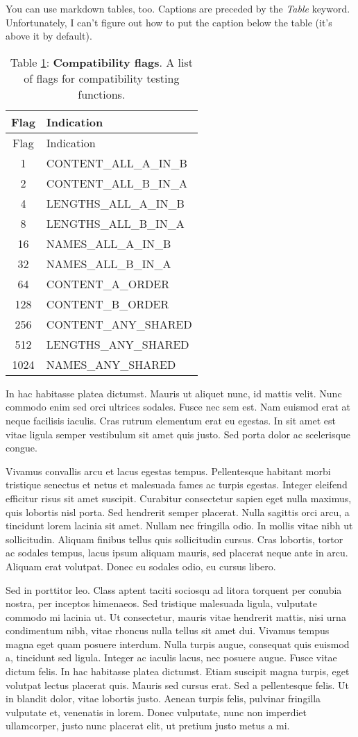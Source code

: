 \documentclass[10pt]{article}
\begin{document}
You can use markdown tables, too. Captions are preceded by the
\emph{Table} keyword. Unfortunately, I can't figure out how to put the
caption below the table (it's above it by default).

\begin{longtable}[]{@{}cl@{}}
\caption{Table \label{param_table}\ref{param_table}:
\textbf{Compatibility flags}. A list of flags for compatibility testing
functions.}\tabularnewline
\toprule
Flag & Indication\tabularnewline
\midrule
\endfirsthead
\toprule
Flag & Indication\tabularnewline
\midrule
\endhead
1 & CONTENT\_ALL\_A\_IN\_B\tabularnewline
2 & CONTENT\_ALL\_B\_IN\_A\tabularnewline
4 & LENGTHS\_ALL\_A\_IN\_B\tabularnewline
8 & LENGTHS\_ALL\_B\_IN\_A\tabularnewline
16 & NAMES\_ALL\_A\_IN\_B\tabularnewline
32 & NAMES\_ALL\_B\_IN\_A\tabularnewline
64 & CONTENT\_A\_ORDER\tabularnewline
128 & CONTENT\_B\_ORDER\tabularnewline
256 & CONTENT\_ANY\_SHARED\tabularnewline
512 & LENGTHS\_ANY\_SHARED\tabularnewline
1024 & NAMES\_ANY\_SHARED\tabularnewline
\bottomrule
\end{longtable}

In hac habitasse platea dictumst. Mauris ut aliquet nunc, id mattis
velit. Nunc commodo enim sed orci ultrices sodales. Fusce nec sem est.
Nam euismod erat at neque facilisis iaculis. Cras rutrum elementum erat
eu egestas. In sit amet est vitae ligula semper vestibulum sit amet quis
justo. Sed porta dolor ac scelerisque congue.

Vivamus convallis arcu et lacus egestas tempus. Pellentesque habitant
morbi tristique senectus et netus et malesuada fames ac turpis egestas.
Integer eleifend efficitur risus sit amet suscipit. Curabitur
consectetur sapien eget nulla maximus, quis lobortis nisl porta. Sed
hendrerit semper placerat. Nulla sagittis orci arcu, a tincidunt lorem
lacinia sit amet. Nullam nec fringilla odio. In mollis vitae nibh ut
sollicitudin. Aliquam finibus tellus quis sollicitudin cursus. Cras
lobortis, tortor ac sodales tempus, lacus ipsum aliquam mauris, sed
placerat neque ante in arcu. Aliquam erat volutpat. Donec eu sodales
odio, eu cursus libero.

Sed in porttitor leo. Class aptent taciti sociosqu ad litora torquent
per conubia nostra, per inceptos himenaeos. Sed tristique malesuada
ligula, vulputate commodo mi lacinia ut. Ut consectetur, mauris vitae
hendrerit mattis, nisi urna condimentum nibh, vitae rhoncus nulla tellus
sit amet dui. Vivamus tempus magna eget quam posuere interdum. Nulla
turpis augue, consequat quis euismod a, tincidunt sed ligula. Integer ac
iaculis lacus, nec posuere augue. Fusce vitae dictum felis. In hac
habitasse platea dictumst. Etiam suscipit magna turpis, eget volutpat
lectus placerat quis. Mauris sed cursus erat. Sed a pellentesque felis.
Ut in blandit dolor, vitae lobortis justo. Aenean turpis felis, pulvinar
fringilla vulputate et, venenatis in lorem. Donec vulputate, nunc non
imperdiet ullamcorper, justo nunc placerat elit, ut pretium justo metus
a mi.
\end{document}
